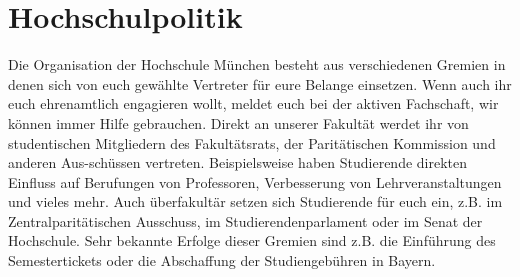 \section{Hochschulpolitik}
Die Organisation der Hochschule München besteht aus verschiedenen 
Gremien in denen sich von euch gewählte Vertreter für eure Belange 
einsetzen. Wenn auch ihr euch ehrenamtlich engagieren wollt, meldet 
euch bei der aktiven Fachschaft, wir können immer Hilfe gebrauchen. \doublebreak
Direkt an unserer Fakultät werdet ihr von studentischen Mitgliedern des 
Fakultätsrats, der Paritätischen Kommission und anderen Aus-schüssen 
vertreten. Beispielsweise haben Studierende direkten Einfluss  auf 
Berufungen von Professoren, Verbesserung von Lehrveranstaltungen 
und vieles mehr. \doublebreak
Auch überfakultär setzen sich Studierende für euch ein, z.B. im 
Zentralparitätischen Ausschuss, im Studierendenparlament oder im 
Senat der Hochschule. Sehr bekannte Erfolge dieser Gremien sind 
z.B. die Einführung des Semestertickets oder die Abschaffung  der 
Studiengebühren in Bayern.



